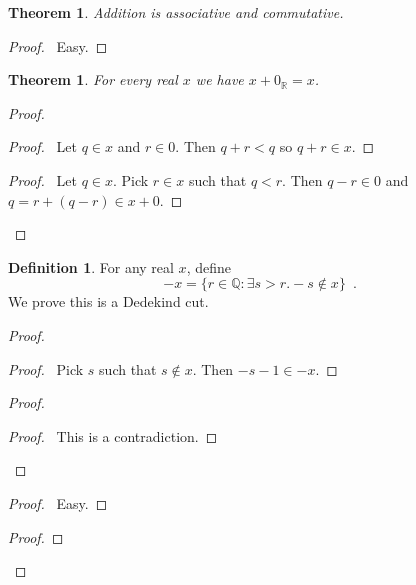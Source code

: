 \documentclass{article}
\let\qed\relax
\newtheorem{theorem}[axiom]{Theorem}
\theoremstyle{definition}
\newtheorem{definition}[axiom]{Definition}
\begin{document}
    \begin{theorem}
        Addition is associative and commutative.
    \end{theorem}

    \begin{proof}
        \pf\ Easy. \qed
    \end{proof}

    \begin{theorem}
        For every real $x$ we have $x + 0_\mathbb{R} = x$.
    \end{theorem}

    \begin{proof}
        \pf
        \begin{proof}
            \pf\ Let $q \in x$ and $r \in 0$. Then $q + r < q$ so $q + r \in x$.
        \end{proof}
        \begin{proof}
            \pf\ Let $q \in x$. Pick $r \in x$ such that $q < r$. Then $q - r \in 0$ and $q = r + (q-r) \in
            x + 0$.
        \end{proof}
        \qed
    \end{proof}

    \begin{definition}
        For any real $x$, define
        \[ - x = \{ r \in \mathbb{Q} : \exists s > r. -s \notin x \} \enspace . \]
        We prove this is a Dedekind cut.
    \end{definition}

    \begin{proof}
        \pf
        \begin{proof}
            \pf\ Pick $s$ such that $s \notin x$. Then $-s-1 \in -x$.
        \end{proof}
        \begin{proof}
            \qedstep
            \begin{proof}
                \pf\ This is a contradiction.
            \end{proof}
        \end{proof}
        \begin{proof}
            \pf\ Easy.
        \end{proof}
        \begin{proof}
        \end{proof}
        \qed
    \end{proof}
\end{document}
